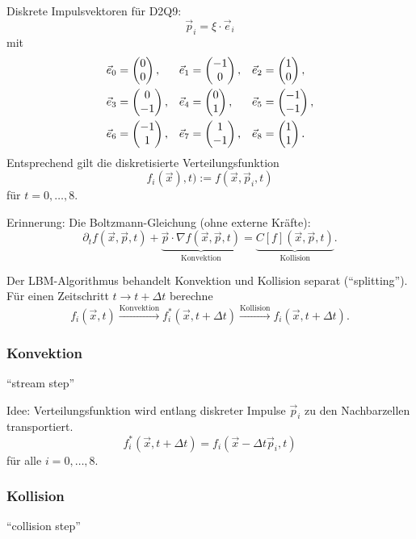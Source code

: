 Diskrete Impulsvektoren für D2Q9:
\[ \vec{p}_i = \xi \cdot \vec{e}_i \]
mit
\begin{align*}
  \vec{e}_0 &= \begin{pmatrix}0\\0\end{pmatrix},
            & \vec{e}_1 &= \begin{pmatrix}-1\\0\end{pmatrix},
            & \vec{e}_2 &= \begin{pmatrix}1\\0\end{pmatrix}, \\
  \vec{e}_3 &= \begin{pmatrix}0\\-1\end{pmatrix},
            & \vec{e}_4 &= \begin{pmatrix}0\\1\end{pmatrix},
            & \vec{e}_5 &= \begin{pmatrix}-1\\-1\end{pmatrix}, \\
  \vec{e}_6 &= \begin{pmatrix}-1\\1\end{pmatrix},
            & \vec{e}_7 &= \begin{pmatrix}1\\-1\end{pmatrix},
            & \vec{e}_8 &= \begin{pmatrix}1\\1\end{pmatrix}.
\end{align*}
Entsprechend gilt die diskretisierte Verteilungsfunktion
\[ f_i(\vec{x}), t) := f( \vec{x}, \vec{p}_i, t) \]
für $t = 0, \ldots, 8$.

Erinnerung: Die Boltzmann-Gleichung (ohne externe Kräfte):
\[ \partial_t f( \vec{x},\vec{p},t) +
  \underbrace{\vec{p} \cdot \nabla f(\vec{x}, \vec{p}, t)}_{\text{Konvektion}}
  = \underbrace{C[f] (\vec{x}, \vec{p}, t)}_{\text{Kollision}}.
\]

Der LBM-Algorithmus behandelt Konvektion und Kollision separat (``splitting'').
Für einen Zeitschritt $t \to t + \Delta t$ berechne
\[ f_i(\vec{x},t) \xrightarrow{\text{Konvektion}}
  f_i^*(\vec{x},t+ \Delta t) \xrightarrow{\text{Kollision}}
  f_i(\vec{x},t+ \Delta t). \]

\subsubsection*{Konvektion}
``stream step''

Idee: Verteilungsfunktion wird entlang diskreter Impulse $\vec{p}_i$ zu den
Nachbarzellen transportiert.
\[ f_i^*(\vec{x},t + \Delta t) = f_i(\vec{x} - \Delta t \vec{p}_i, t) \]
für alle $i = 0, \ldots, 8$.

\subsubsection*{Kollision}
``collision step''

